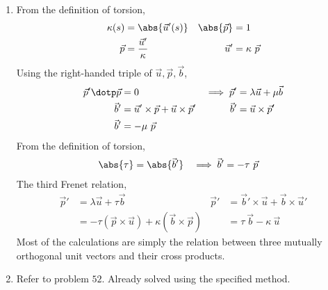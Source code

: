 \begin{enumerate}
    \item From the definition of torsion,
          \begin{align}
              \kappa(s)     & = \abs{\vec{u}'(s)}       &
              \abs{\vec{p}} & = 1                         \\
              \vec{p}       & = \frac{\vec{u}'}{\kappa} &
              \vec{u}'      & = \kappa\ \vec{p}
          \end{align}
          Using the right-handed triple of $ \vec{u}, \vec{p}, \vec{b} $,
          \begin{align}
              \vec{p}' \dotp \vec{p}    & = 0                             &
              \implies \vec{p}'         & = \lambda \vec{u} + \mu \vec{b}   \\
              \vec{b}'                  & = \vec{u}' \times \vec{p}
              + \vec{u} \times \vec{p}' &
              \vec{b}'                  & = \vec{u} \times \vec{p}'         \\
              \vec{b}'                  & = -\mu\ \vec{p}
          \end{align}
          From the definition of torsion,
          \begin{align}
              \abs{\tau}        & = \abs{\vec{b}'} &
              \implies \vec{b}' & = -\tau\ \vec{p}
          \end{align}
          The third Frenet relation,
          \begin{align}
              \vec{p}'                          & = \lambda \vec{u} + \tau \vec{b}    &
              \vec{p}'                          & = \vec{b}' \times \vec{u} + \vec{b}
              \times \vec{u}'                                                           \\
                                                & = -\tau (\vec{p} \times \vec{u})
              + \kappa (\vec{b} \times \vec{p}) &
                                                & = \tau \ \vec{b} - \kappa \ \vec{u}
          \end{align}
          Most of the calculations are simply the relation between three mutually
          orthogonal unit vectors and their cross products.

    \item Refer to problem $52$. Already solved using the specified method.
\end{enumerate}